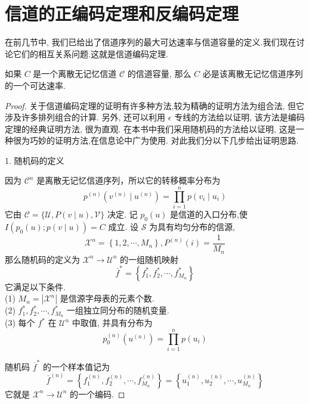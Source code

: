 \section{信道的正编码定理和反编码定理}
在前几节中, 我们已给出了信道序列的最大可达速率与信道容量的定义.我们现在讨论它们的相互关系问题.这就是信道编码定理.

\begin{theorem}[信道编码的正编码定理]
    如果 $ C $ 是一个离散无记忆信道 $ \mathscr{C} $ 的信道容量, 那么 $ C $ 必是该离散无记忆信道序列的一个可达速率.
\end{theorem}
\begin{proof}
    关于信道编码定理的证明有许多种方法,较为精确的证明方法为组合法, 但它涉及许多排列组合的计算. 另外, 还可以利用 $ \epsilon $ 专线的方法给以证明, 该方法是编码定理的经典证明方法, 很为直观. 在本书中我们采用随机码的方法给以证明, 这是一种很为巧妙的证明方法,在信息论中广为使用. 对此我们分以下几步给出证明思路.

    1. 随机码的定义

因为 $ \mathscr{C}^{n} $ 是离散无记忆信道序列，所以它的转移概率分布为
$$
p^{(n)}\left(v^{(n)} \mid u^{(n)}\right)=\prod_{i=1}^{n} p\left(v_{i} \mid u_{i}\right)
$$
它由 $ \mathscr{C}=\{\mathscr{U}, P(v \mid u), \mathscr{V}\} $ 决定. 记 $ p_{0}(u) $ 是信道的入口分布,使 $ I\left(p_{0}(u) ; p(v \mid u)\right)=C $ 成立. 设 $ \mathscr{S} $ 为具有均匀分布的信源,
\begin{equation}
    \mathscr{X}^{n}=\left\{1,2, \cdots, M_{n}\right\}, P^{(n)}(i)=\frac{1}{M_{n}}
\end{equation}
那么随机码的定义为 $ \mathscr{X}^{n} \rightarrow \mathscr{U}^{n} $ 的一组随机映射
\begin{equation}\label{4.6.2}
\overline{f}^{*}=\left\{f_{1}^{*}, f_{2}^{*}, \cdots, f_{M_{n}}^{*}\right\}
\end{equation}
它满足以下条件.\\
(1) $ M_{n}=\left|\mathscr{X}^{n}\right| $ 是信源字母表的元素个数.\\
(2) $ f_{1}^{*}, f_{2}^{*}, \cdots, f_{M_{n}}^{*} $ 一组独立同分布的随机变量.\\
(3) 每个 $ f^{*} $ 在 $ \mathscr{U}^{n} $ 中取值, 并具有分布为
$$
p_{0}^{(n)}\left(u^{(n)}\right)=\prod_{i=1}^{n} p\left(u_{i}\right)
$$

随机码 $ \overline{f}^{*} $ 的一个样本值记为
\begin{equation}\label{4.6.3}
\overline{f}^{(n)}=\left\{f_{1}^{(n)}, f_{2}^{(n)}, \cdots, f_{M_{n}}^{(n)}\right\}=\left\{u_{1}^{(n)}, u_{2}^{(n)}, \cdots, u_{M_{n}}^{(n)}\right\}
\end{equation}
它就是 $ \mathscr{X}^{n} \rightarrow \mathscr{U}^{n} $ 的一个编码.


\end{proof}
